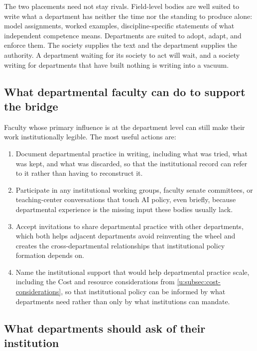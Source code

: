 \documentclass{SIAMbook2023}
\begin{document}
The two placements need not stay rivals. Field-level bodies are well suited to write what a department has neither the time nor the standing to produce alone: model assignments, worked examples, discipline-specific statements of what independent competence means. Departments are suited to adopt, adapt, and enforce them. The society supplies the text and the department supplies the authority. A department waiting for its society to act will wait, and a society writing for departments that have built nothing is writing into a vacuum.

\subsection{What departmental faculty can do to support the bridge}
\label{u:subsec:dept-to-institution-actions}

Faculty whose primary influence is at the department level can still make their work institutionally legible. The most useful actions are:
\begin{enumerate}
\item Document departmental practice in writing, including what was tried, what was kept, and what was discarded, so that the institutional record can refer to it rather than having to reconstruct it.
\item Participate in any institutional working groups, faculty senate committees, or teaching-center conversations that touch AI policy, even briefly, because departmental experience is the missing input these bodies usually lack.
\item Accept invitations to share departmental practice with other departments, which both helps adjacent departments avoid reinventing the wheel and creates the cross-departmental relationships that institutional policy formation depends on.
\item Name the institutional support that would help departmental practice scale, including the Cost and resource considerations from \cref{u:subsec:cost-considerations}, so that institutional policy can be informed by what departments need rather than only by what institutions can mandate.
\end{enumerate}

\subsection{What departments should ask of their institution}
\label{u:subsec:what-to-ask-institution}
\end{document}
